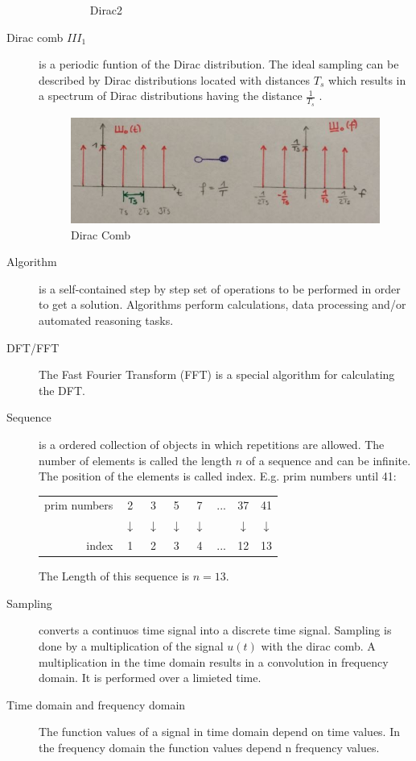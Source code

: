 \begin{description}
\begin{enumerate}
\begin{figure}[!h]
					\caption{Dirac2}
					\label{fig:dirac2}
				\end{figure}				
		\end{enumerate}
	\item[Dirac comb ${III}_1$] is a periodic funtion of the Dirac distribution. The ideal sampling can be described by Dirac distributions located with distances $T_s$ which results in a spectrum of Dirac distributions having the distance $\frac{1}{T_s}$ .
		\begin{figure}[!h]
			\centering
			\includegraphics[width=0.7\linewidth]{images/diraccomb}
			\caption{Dirac Comb}
			\label{fig:diraccomb}
		\end{figure}
	\item[Algorithm] is a self-contained step by step set of operations to be performed in order to get a solution. Algorithms perform calculations, data processing and/or automated reasoning tasks.
	\item[DFT/FFT] The Fast Fourier Transform (FFT) is a special algorithm for calculating the DFT.
	\item[Sequence] is a ordered collection of objects in which repetitions are allowed. The number of elements is called the length $n$ of a sequence and can be infinite. The position of the elements is called index.
	E.g. prim numbers until 41: 
	
	\begin{tabular}{rccccccc} 
		prim numbers &2 & 3 & 5 & 7 & ... & 37 & 41 \\  
		& $\downarrow$ & $\downarrow$ & $\downarrow$ & $\downarrow$ &  & $\downarrow$ &   $\downarrow$ \\ 
		index & 1 & 2 & 3 & 4 & ...   & 12 & 13 \\ 
	\end{tabular} 
	
	The Length of this sequence is $n=13$.
	
	\item[Sampling] converts a continuos time signal into a discrete time signal. Sampling is done by a multiplication of the signal $u(t)$ with the dirac comb. A multiplication in the time domain results in a convolution in frequency domain. It is performed over a limieted time.
	\item[Time domain and frequency domain] The function values of a signal in time domain depend on time values. In the frequency domain the function values depend n frequency values.
	

\end{description}
